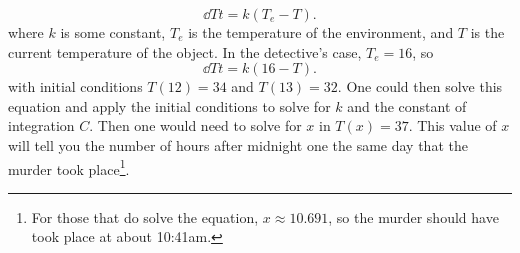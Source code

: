 \begin{enumerate}[label=\arabic*.]
\begin{equation*}
			\dd{T}{t} = k\left(T_e - T\right).
		\end{equation*}
		where $k$ is some constant, $T_e$ is the temperature of the environment, and $T$ is the current temperature of the object.
		In the detective's case, $T_e = 16$, so
		\begin{equation*}
			\dd{T}{t} = k(16-T).
		\end{equation*}
		with initial conditions $T(12) = 34$ and $T(13) = 32$.
		One could then solve this equation and apply the initial conditions to solve for $k$ and the constant of integration $C$.
		Then one would need to solve for $x$ in $T(x) = 37$.
		This value of $x$ will tell you the number of hours after midnight one the same day that the murder took place\footnote{For those that do solve the equation, $x \approx 10.691$, so the murder should have took place at about 10:41am.}.
\end{enumerate}